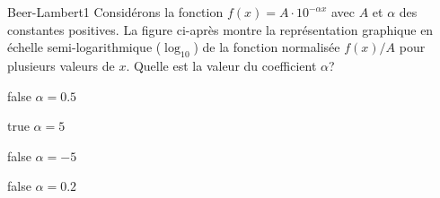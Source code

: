 		\begin{question}{27}{Beer-Lambert}{1}{}
            Considérons la fonction $f(x) = A\cdot 10^{-\alpha x}$ avec $A$ et $\alpha$ des constantes positives. La figure ci-après montre la représentation graphique en échelle semi-logarithmique ($\log_{10}$) de la fonction normalisée $f(x)/A$ pour plusieurs valeurs de $x$. Quelle est la valeur du coefficient $\alpha$?
            \begin{figure}
             \end{figure}
        \end{question}
        \begin{reponses}
            \item[false] $\alpha = \num{0.5}$
		    \item[true] $\alpha = 5$
		    \item[false] $\alpha = -5$
		    \item[false] $\alpha = \num{0.2}$
		    \end{reponses}
